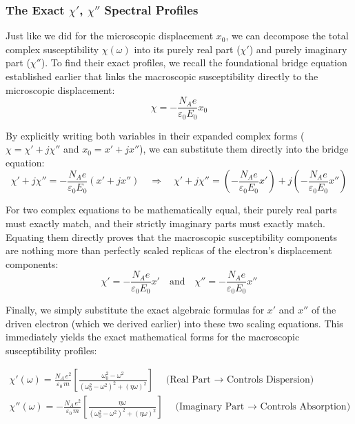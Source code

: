 \subsubsection{The Exact \texorpdfstring{$\chi'$, $\chi''$}{χ', χ''} Spectral Profiles}

Just like we did for the microscopic displacement $x_0$, we can decompose the total complex susceptibility $\chi(\omega)$ into its purely real part ($\chi'$) and purely imaginary part ($\chi''$). To find their exact profiles, we recall the foundational bridge equation established earlier that links the macroscopic susceptibility directly to the microscopic displacement:
\begin{equation*}
    \chi = -\frac{N_A e}{\varepsilon_0 E_0} x_0
\end{equation*}

By explicitly writing both variables in their expanded complex forms ($\chi = \chi' + j\chi''$ and $x_0 = x' + jx''$), we can substitute them directly into the bridge equation:
\begin{equation*}
    \chi' + j\chi'' = -\frac{N_A e}{\varepsilon_0 E_0} (x' + jx'') \quad \Rightarrow \quad \chi' + j\chi'' = \left(-\frac{N_A e}{\varepsilon_0 E_0}x'\right) + j\left(-\frac{N_A e}{\varepsilon_0 E_0}x''\right)
\end{equation*}

For two complex equations to be mathematically equal, their purely real parts must exactly match, and their strictly imaginary parts must exactly match. Equating them directly proves that the macroscopic susceptibility components are nothing more than perfectly scaled replicas of the electron's displacement components:
\begin{equation*}
    \chi' = -\frac{N_A e}{\varepsilon_0 E_0}x' \quad \text{and} \quad \chi'' = -\frac{N_A e}{\varepsilon_0 E_0}x''
\end{equation*}

Finally, we simply substitute the exact algebraic formulas for $x'$ and $x''$ of the driven electron (which we derived earlier) into these two scaling equations. This immediately yields the exact mathematical forms for the macroscopic susceptibility profiles:
\begin{keyresult}
    \begin{gather}
        \chi'(\omega) = \frac{N_A\,e^2}{\varepsilon_0\,m} \left[ \frac{\omega_0^2 - \omega^2}{(\omega_0^2 - \omega^2)^2 + (\eta\omega)^2} \right] \quad \text{(Real Part $\to$ Controls Dispersion)} \\[1ex]
        \chi''(\omega) = -\frac{N_A\,e^2}{\varepsilon_0\,m} \left[ \frac{\eta\omega}{(\omega_0^2 - \omega^2)^2 + (\eta\omega)^2} \right] \quad \text{(Imaginary Part $\to$ Controls Absorption)}
    \end{gather}
\end{keyresult}

